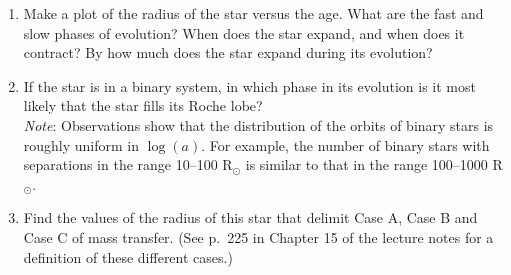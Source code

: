 \documentclass[11pt,a4paper]{article}
\begin{document}
\begin{enumerate}
\item Make a plot of the radius of the star versus the age. What are the fast and slow phases of evolution? When does the star expand, and when does it contract? By how much does the star expand during its evolution?
\item If the star is in a binary system, in which phase in its evolution is it most likely that the star fills its Roche lobe?\\
\textit{Note}: Observations show that the distribution of the orbits of binary stars is roughly uniform in $\log(a)$. For example, the number of binary stars with separations in the range 10--100 R$_\odot$ is similar to that in the range 100--1000 R$_\odot$.
\item Find the values of the radius of this star that delimit Case A, Case B and Case C of mass transfer. (See p.\ 225 in Chapter 15 of the lecture notes for a definition of these different cases.)
\end{enumerate}




    

        
\end{document}
